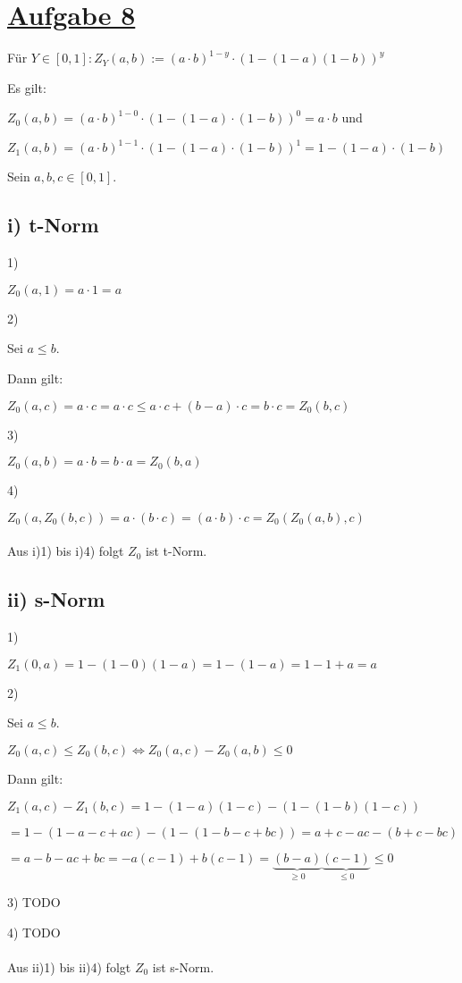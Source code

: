\section*{\underline{Aufgabe 8}}

Für $Y \in [0,1] : Z_Y (a,b) := (a\cdot b)^{1-y}\cdot(1-(1-a)(1-b))^y$

Es gilt:

$Z_0(a,b) = (a\cdot b)^{1-0} \cdot (1-(1-a)\cdot (1-b))^0 = a\cdot b $ und

$Z_1(a,b) = (a\cdot b)^{1-1} \cdot (1-(1-a)\cdot (1-b))^1 = 1-(1-a)\cdot (1-b) $

Sein $a,b,c \in [0,1]$.

\subsection*{i) t-Norm}
1) 

$Z_0(a,1) = a\cdot1 = a$

2) 

Sei $a \leq  b$.

Dann gilt:

$Z_0(a,c) = a\cdot c = a\cdot c \leq a\cdot c + (b-a)\cdot c = b\cdot c = Z_0(b,c)$

3) 

$Z_0(a,b) = a\cdot b = b\cdot a = Z_0(b,a)$

4)

$Z_0(a,Z_0(b,c)) = a\cdot (b\cdot c) = (a\cdot b)\cdot c = Z_0(Z_0(a,b),c)$

\paragraph*{}
Aus i)1) bis i)4) folgt $Z_0$ ist t-Norm.


\subsection*{ii) s-Norm}

1) 

$Z_1(0,a) = 1-(1-0)(1-a) = 1-(1-a) = 1-1+a= a$

2) 

Sei $a \leq  b$.

$Z_0(a,c) \leq Z_0(b,c) \Leftrightarrow Z_0(a,c) - Z_0(a,b) \leq 0$

Dann gilt:

$Z_1(a,c) - Z_1(b,c) = 1 - (1-a)(1-c) - (1 - (1-b)(1-c))$

$= 1-(1-a-c+ac)- (1-(1-b-c+bc)) = a+c-ac - (b+c-bc)$

$= a-b -ac + bc = -a(c-1) + b(c-1) = \underbrace{(b-a)}_{\geq 0}\underbrace{(c-1)}_{\leq 0} \leq 0 $

3)
TODO

4)
TODO

\paragraph*{}

Aus ii)1) bis ii)4) folgt $Z_0$ ist s-Norm.
 


